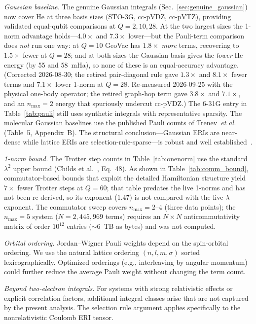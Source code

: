 \documentclass[aps,pra,twocolumn,superscriptaddress,longbibliography]{revtex4-2}
\newcommand{\gvq}[2]{#2}
\begin{document}
\emph{Gaussian baseline.}  The genuine Gaussian integrals
(Sec.~\ref{sec:genuine_gaussian}) now cover He at three basis sizes
(STO-3G, cc-pVDZ, cc-pVTZ), providing validated equal-qubit
comparisons at $Q = 2, 10, 28$.  At the two largest sizes the
1-norm advantage holds---$4.0\times$ and $7.3\times$ lower---but the
Pauli-term comparison does \emph{not} run one way: at $Q = 10$ GeoVac has
$1.8\times$ \emph{more} terms, recovering to $1.5\times$ fewer at $Q = 28$;
and at both sizes the Gaussian basis gives the \emph{lower} He energy
(by 55 and 58~mHa), so none of these is an equal-accuracy advantage.
(Corrected 2026-08-30; the retired pair-diagonal rule gave $1.3\times$ and
$8.1\times$ fewer terms and $7.1\times$ lower 1-norm at $Q=28$.
Re-measured 2026-09-25 with the physical one-body operator; the retired
graph-hop term gave $3.8\times$ and $7.1\times$, and an $n_{\max}=2$ energy
that spuriously undercut cc-pVDZ.)
The 6-31G entry in Table~\ref{tab:pauli} still uses synthetic
integrals with representative sparsity.  The molecular Gaussian
baselines use the published Pauli counts of
Trenev~\textit{et al.}~\cite{trenev2025} (Table~5, Appendix~B).  The structural
conclusion---Gaussian ERIs are near-dense while lattice ERIs
are selection-rule-sparse---is robust and well
established~\cite{helgaker2000}.

\emph{1-norm bound.}  The Trotter step counts in Table~\ref{tab:onenorm}
use the standard $\lambda^2$ upper bound (Childs et al.~\cite{childs2021},
Eq.~48).  As shown in Table~\ref{tab:comm_bound}, commutator-based bounds
that exploit the detailed Hamiltonian structure yield $7\times$ fewer Trotter
steps at $Q = 60$; that table predates the live 1-norms and has not been
re-derived, so its exponent ($1.47$) is not compared with the live
$\lambda$ exponent.
The commutator sweep covers $n_{\max} = 2$--$4$ (three data points);
the $n_{\max} = 5$ system ($N = \gvq{he_n5_pauli}{2{,}445{,}969}$ terms) requires
an $N \times N$ anticommutativity matrix of order $10^{12}$ entries
($\sim\!6$~TB as bytes) and was not computed.

\emph{Orbital ordering.}  Jordan--Wigner Pauli weights depend on the
spin-orbital ordering.  We use the natural lattice ordering
$(n, l, m, \sigma)$ sorted lexicographically.  Optimized orderings (e.g.,
interleaving by angular momentum) could further reduce the average Pauli
weight without changing the term count.

\emph{Beyond two-electron integrals.}  For systems with strong
relativistic effects or explicit correlation factors, additional integral
classes arise that are not captured by the present analysis.  The selection
rule argument applies specifically to the nonrelativistic Coulomb ERI
tensor.
\end{document}

